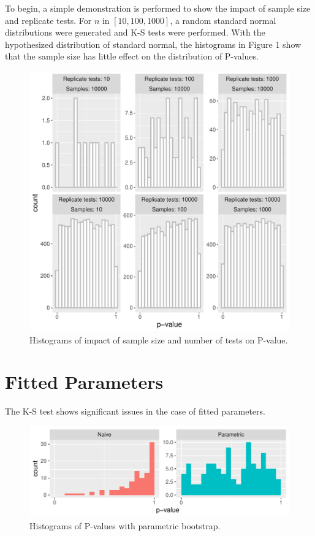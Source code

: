 \documentclass[12pt, letterpaper, titlepage]{article}
\begin{document}
To begin, a simple demonstration is performed to show the impact of sample size and replicate tests. For $n$ in $[10, 100, 1000]$, a random standard normal distributions were generated and K-S tests were performed. With the hypothesized distribution of standard normal, the histograms in Figure 1 show that the sample size has little effect on the distribution of P-values.

\begin{figure}[!ht]
  \centering
  \includegraphics[width=0.8\linewidth]{hist_normal}
  \caption{Histograms of impact of sample size and number of tests on P-value.}
  \label{fig:hist_normal}
\end{figure}

\hypertarget{sec:fitted}{%
\section{Fitted Parameters}\label{sec:fitted}}

The K-S test shows significant issues in the case of fitted parameters.

\begin{figure}[!ht]
  \centering
  \includegraphics[width=0.8\linewidth]{hist_parametric}
  \caption{Histograms of P-values with parametric bootstrap.}
  \label{fig:hist_parametric}
\end{figure}
\end{document}
